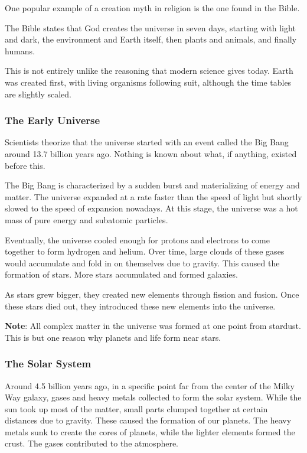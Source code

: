 \documentclass[11pt]{article}
\begin{document}
One popular example of a creation myth in religion is the one found in the Bible.

The Bible states that God creates the universe in seven days, starting with light and dark, the environment and Earth itself, then plants and animals, and finally humans.

This is not entirely unlike the reasoning that modern science gives today. Earth was created first, with living organisms following suit, although the time tables are slightly scaled.

\subsubsection{The Early Universe}
\label{sec:orgabddf0f}

Scientists theorize that the universe started with an event called the Big Bang around 13.7 billion years ago. Nothing is known about what, if anything, existed before this.

The Big Bang is characterized by a sudden burst and materializing of energy and matter. The universe expanded at a rate faster than the speed of light but shortly slowed to the speed of expansion nowadays. At this stage, the universe was a hot mass of pure energy and subatomic particles.

Eventually, the universe cooled enough for protons and electrons to come together to form hydrogen and helium. Over time, large clouds of these gases would accumulate and fold in on themselves due to gravity. This caused the formation of stars. More stars accumulated and formed galaxies.

As stars grew bigger, they created new elements through fission and fusion. Once these stars died out, they introduced these new elements into the universe.

\textbf{Note}: All complex matter in the universe was formed at one point from stardust. This is but one reason why planets and life form near stars.

\subsubsection{The Solar System}
\label{sec:orgf6b4891}

Around 4.5 billion years ago, in a specific point far from the center of the Milky Way galaxy, gases and heavy metals collected to form the solar system. While the sun took up most of the matter, small parts clumped together at certain distances due to gravity. These caused the formation of our planets. The heavy metals sunk to create the cores of planets, while the lighter elements formed the crust. The gases contributed to the atmosphere.
\end{document}
